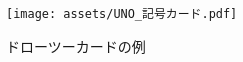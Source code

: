 \documentclass[11pt]{ltjsarticle}
\begin{document}
\begin{figure}[h]
  \begin{center}
    \texttt{[image: assets/UNO\_記号カード.pdf]}
    \caption{ドローツーカードの例}
    \label{fig:ドローツーカードの例}
  \end{center}
\end{figure}
\end{document}
